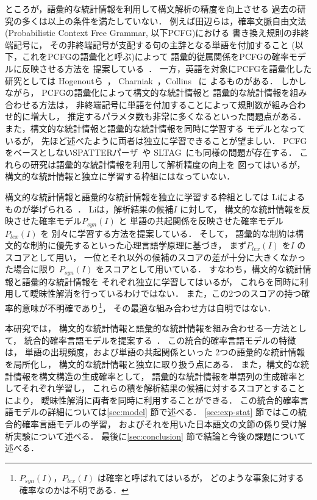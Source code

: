 ところが，語彙的な統計情報を利用して構文解析の精度を向上させる
過去の研究の多くは以上の条件を満たしていない．
例えば田辺らは，確率文脈自由文法
(Probabilistic Context Free Grammar, 以下PCFG)における
書き換え規則の非終端記号に，
その非終端記号が支配する句の主辞となる単語を付加すること
(以下，これをPCFGの語彙化と呼ぶ)によって
語彙的従属関係をPCFGの確率モデルに反映させる方法を
提案している~\cite{tanabe:95:a}．
一方，英語を対象にPCFGを語彙化した研究としては
Hogenoutら~\cite{hogenout:96:a}，
Charniak~\cite{charniak:97:a}，Collins~\cite{collins:97:a} に
よるものがある．
しかしながら，
PCFGの語彙化によって構文的な統計情報と
語彙的な統計情報を組み合わせる方法は，
非終端記号に単語を付加することによって規則数が組み合わせ的に増大し，
推定するパラメタ数も非常に多くなるといった問題点がある．
また，構文的な統計情報と語彙的な統計情報を同時に学習する
モデルとなっているが，
先ほど述べたように両者は独立に学習できることが望ましい．
PCFGをベースとしないSPATTERパーザ~\cite{magerman:95:a}や
SLTAG~\cite{schabes:92:a,resnik:92:b}にも同様の問題が存在する．
これらの研究は語彙的な統計情報を利用して解析精度の向上を
図ってはいるが，
構文的な統計情報と独立に学習する枠組にはなっていない．

構文的な統計情報と語彙的な統計情報を独立に学習する枠組としては
Liによるものが挙げられる~\cite{li:96:a,li:96:b}．
Liは，解析結果の候補$I$ に対して，
構文的な統計情報を反映させた確率モデル$P_{syn}(I)$ と
単語の共起関係を反映させた確率モデル$P_{lex}(I)$ を
別々に学習する方法を提案している．
そして，
語彙的な制約は構文的な制約に優先するといった心理言語学原理に基づき，
まず$P_{lex}(I)$ を$I$ のスコアとして用い，
一位とそれ以外の候補のスコアの差が十分に大きくなかった場合に限り
$P_{syn}(I)$ をスコアとして用いている．
すなわち，構文的な統計情報と語彙的な統計情報を
それぞれ独立に学習してはいるが，
これらを同時に利用して曖昧性解消を行っているわけではない．
また，この2つのスコアの持つ確率的意味が不明確であり\footnote{
  $P_{syn}(I)$，$P_{lex}(I)$ は確率と呼ばれてはいるが，
  どのような事象に対する確率なのかは不明である．
  }，
その最適な組み合わせ方は自明ではない．


本研究では，
構文的な統計情報と語彙的な統計情報を組み合わせる一方法として，
統合的確率言語モデルを提案する~\cite{inui:97:b,inui:97:e,sirai:96:a}．
この統合的確率言語モデルの特徴は，
単語の出現頻度，および単語の共起関係といった
2つの語彙的な統計情報を局所化し，
構文的な統計情報と独立に取り扱う点にある．
また，構文的な統計情報を構文構造の生成確率として，
語彙的な統計情報を単語列の生成確率としてそれぞれ学習し，
これらの積を解析結果の候補に対するスコアとすることにより，
曖昧性解消に両者を同時に利用することができる．
この統合的確率言語モデルの詳細については\ref{sec:model} 節で述べる．
\ref{sec:exp-stat} 節ではこの統合的確率言語モデルの学習，
およびそれを用いた日本語文の文節の係り受け解析実験について述べる．
最後に\ref{sec:conclusion} 節で結論と今後の課題について述べる．
